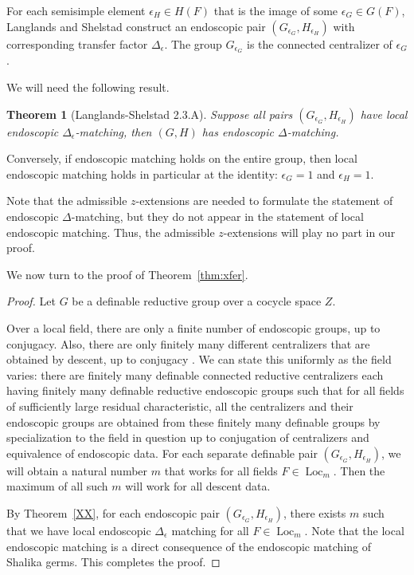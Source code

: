 \documentclass[12pt]{amsart}
\newcommand{\op}[1]{\operatorname{#1}}
\theoremstyle{plain}
\newtheorem{theorem}[thm]{Theorem}
\theoremstyle{definition}
\begin{document}
For each semisimple element $\epsilon_H \in H(F)$ that is the image of
some $\epsilon_G\in G(F)$, Langlands and Shelstad construct an
endoscopic pair $(G_{\epsilon_G},H_{\epsilon_H})$ with corresponding
transfer factor $\Delta_\epsilon$.  The group $G_{\epsilon_G}$ is the
connected centralizer of $\epsilon_G$.

We will need the following result.

\begin{theorem}[Langlands-Shelstad 2.3.A]  Suppose all pairs
  $(G_{\epsilon_G},H_{\epsilon_H})$ have local endoscopic
  $\Delta_\epsilon$-matching, then $(G,H)$ has endoscopic $\Delta$-matching.
\end{theorem}

Conversely, if endoscopic matching holds on the entire group, then
local endoscopic matching holds in particular at the identity:
$\epsilon_G = 1$ and $\epsilon_H =1$.

Note that the admissible $z$-extensions are needed to formulate the
statement of endoscopic $\Delta$-matching, but they do not appear in
the statement of local endoscopic matching.  Thus, the admissible
$z$-extensions will play no part in our proof.

We now turn to the proof of Theorem~\ref{thm:xfer}.

\begin{proof} Let $G$ be a definable reductive group over a cocycle
  space $Z$.

  Over a local field, there are only a finite number of endoscopic
  groups, up to conjugacy.  Also, there are only finitely many
  different centralizers that are obtained by descent, up to conjugacy
  \cite[Sec.2.2]{LSd}.  We can state this uniformly as the field
  varies: there are finitely many definable connected reductive
  centralizers each having finitely many definable reductive
  endoscopic groups such that for all fields of sufficiently large
  residual characteristic, all the centralizers and their endoscopic
  groups are obtained from these finitely many definable groups by
  specialization to the field in question up to conjugation of
  centralizers and equivalence of endoscopic data.  For each separate
  definable pair $(G_{\epsilon_G},H_{\epsilon_H})$, we will obtain a
  natural number $m$ that works for all fields $F\in \op{Loc}_m$.
  Then the maximum of all such $m$ will work for all descent data.

  By Theorem~\ref{XX}, for each endoscopic pair
  $(G_{\epsilon_G},H_{\epsilon_H})$, there exists $m$ such that we
  have local endoscopic $\Delta_\epsilon$ matching for all
  $F\in\op{Loc}_m$.  Note that the local endoscopic matching is
  a direct consequence of the endoscopic matching of Shalika germs.  This
  completes the proof.
\end{proof}
\end{document}
